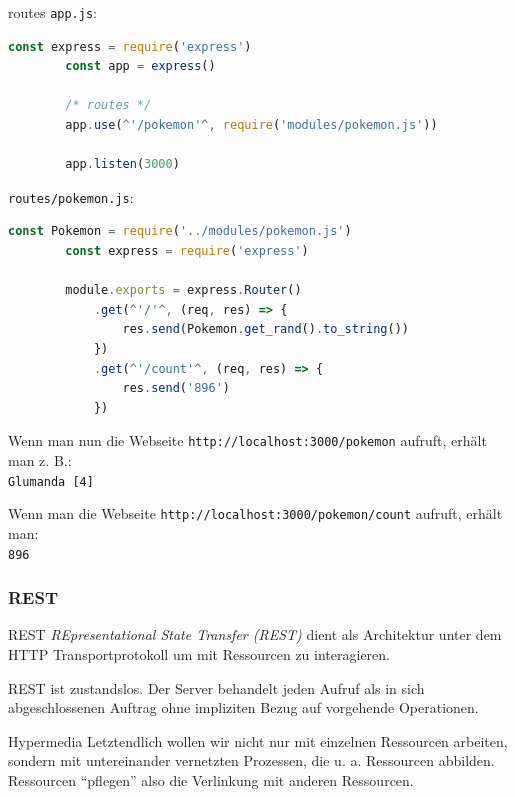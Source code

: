 \begin{example}{routes}
    \texttt{app.js}:
    \begin{lstlisting}[language=JavaScript]
        const express = require('express')
        const app = express()

        /* routes */
        app.use(^'/pokemon'^, require('modules/pokemon.js'))

        app.listen(3000)
    \end{lstlisting}

    \texttt{routes/pokemon.js}:
    \begin{lstlisting}[language=JavaScript]
        const Pokemon = require('../modules/pokemon.js')
        const express = require('express')
        
        module.exports = express.Router()
            .get(^'/'^, (req, res) => {
                res.send(Pokemon.get_rand().to_string())
            })
            .get(^'/count'^, (req, res) => {
                res.send('896')
            })
    \end{lstlisting}

    Wenn man nun die Webseite \texttt{http://localhost:3000/pokemon} aufruft, erhält man z. B.:\\
    \texttt{Glumanda [4]}

    Wenn man die Webseite \texttt{http://localhost:3000/pokemon/count} aufruft, erhält man:\\
    \texttt{896}
\end{example}

\subsubsection{REST}

\begin{defi}{REST}
    \emph{REpresentational State Transfer (REST)} dient als Architektur unter dem HTTP Transportprotokoll um mit Ressourcen zu interagieren.

    REST ist zustandslos.
    Der Server behandelt jeden Aufruf als in sich abgeschlossenen Auftrag ohne impliziten Bezug auf vorgehende Operationen.
\end{defi}

\begin{defi}{Hypermedia}
    Letztendlich wollen wir nicht nur mit einzelnen Ressourcen arbeiten, sondern mit untereinander vernetzten Prozessen, die u. a. Ressourcen abbilden.
    Ressourcen \enquote{pflegen} also die Verlinkung mit anderen Ressourcen.
\end{defi}

